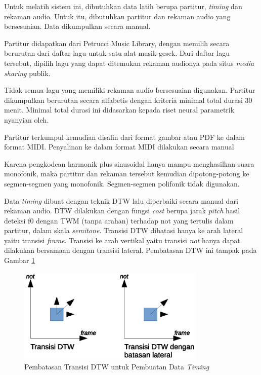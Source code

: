 Untuk melatih sistem ini, dibutuhkan data latih berupa partitur, \textit{timing} dan rekaman audio. Untuk itu, dibutuhkan partitur dan rekaman audio yang bersesuaian. Data dikumpulkan secara manual.

Partitur didapatkan dari Petrucci Music Library, dengan memilih secara berurutan dari daftar lagu untuk satu alat musik gesek. Dari daftar lagu tersebut, dipilih lagu yang dapat ditemukan rekaman audionya pada situs \textit{media sharing} publik.

Tidak semua lagu yang memiliki rekaman audio bersesuaian digunakan. Partitur dikumpulkan berurutan secara alfabetis dengan kriteria minimal total durasi 30 menit. Minimal total durasi ini didasarkan kepada riset neural parametrik nyanyian oleh.

Partitur terkumpul kemudian disalin dari format gambar atau PDF ke dalam format MIDI. Penyalinan ke dalam format MIDI dilakukan secara manual

Karena pengkodean harmonik plus sinusoidal hanya mampu menghasilkan suara monofonik, maka partitur dan rekaman tersebut kemudian dipotong-potong ke segmen-segmen yang monofonik. Segmen-segmen polifonik tidak digunakan.

Data \textit{timing} dibuat dengan teknik DTW lalu diperbaiki secara manual dari rekaman audio. DTW dilakukan dengan fungsi \textit{cost} berupa jarak \textit{pitch} hasil deteksi f0 dengan TWM (tanpa arahan) terhadap  not yang tertulis dalam partitur, dalam skala \textit{semitone}. Transisi DTW dibatasi hanya ke arah lateral yaitu transisi \textit{frame}. Transisi ke arah vertikal yaitu transisi \textit{not} hanya dapat dilakukan bersamaan dengan transisi lateral. Pembatasan DTW ini tampak pada Gambar \ref{fig-dtw-transition}

\begin{figure}[htb]
    \centering
    \includegraphics[width=0.8\textwidth]{resources/DTW-transition.eps}
    \caption{Pembatasan Transisi DTW untuk Pembuatan Data \textit{Timing}}\label{fig-dtw-transition}
\end{figure}

